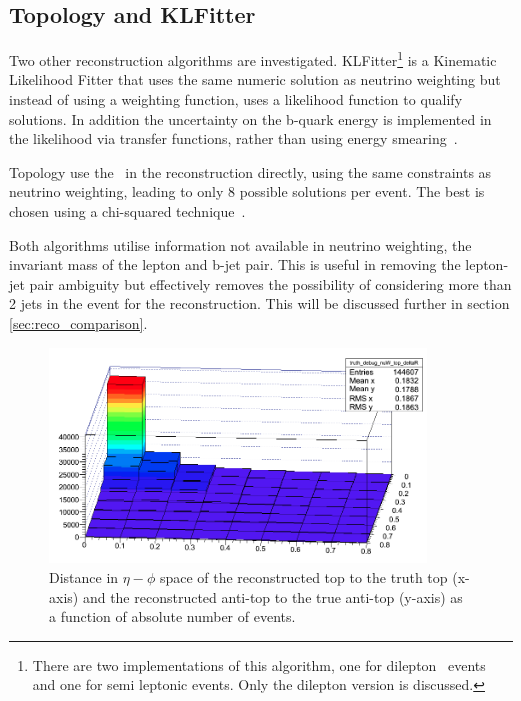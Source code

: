 
\subsection{Topology and KLFitter}
Two other reconstruction algorithms are investigated. KLFitter\footnote{There are two implementations of this algorithm, one for dilepton \ttbar\ events and one for semi leptonic \ttbar events. Only the dilepton version is discussed.} is a Kinematic Likelihood Fitter that uses the same numeric solution as neutrino weighting but instead of using a weighting function, uses a likelihood function to qualify solutions. In addition the uncertainty on the b-quark energy is implemented in the likelihood via transfer functions, rather than using energy smearing~\cite{klfitter}.

Topology use the \etmiss\ in the reconstruction directly, using the same constraints as neutrino weighting, leading to only 8 possible solutions per event. The best is chosen using a chi-squared technique~\cite{topology}.

Both algorithms utilise information not available in neutrino weighting, the invariant mass of the lepton and b-jet pair. This is useful in removing the lepton-jet pair ambiguity but effectively removes the possibility of considering more than 2 jets in the event for the reconstruction. This will be discussed further in section \ref{sec:reco_comparison}.


\clearpage

\begin{figure}[htbp!]
	\begin{center}
	\includegraphics[width=100mm]{f/top_deltaR}
	\end{center}
	\caption{Distance in $\eta - \phi$ space of the reconstructed top to the truth top (x-axis) and the reconstructed anti-top to the true anti-top (y-axis) as a function of absolute number of events.}
	\label{fig:top_dr}
\end{figure}


